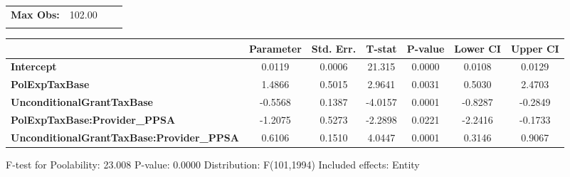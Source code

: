 \begin{center}
\begin{tabular}{lclc}
\textbf{Max Obs:}                                 &       102.00       & \textbf{                     }   &                  \\
\textbf{}                                         &                    & \textbf{                     }   &                  \\
\bottomrule
\end{tabular}
\begin{tabular}{lcccccc}
                                                  & \textbf{Parameter} & \textbf{Std. Err.} & \textbf{T-stat} & \textbf{P-value} & \textbf{Lower CI} & \textbf{Upper CI}  \\
\midrule
\textbf{Intercept}                                &       0.0119       &       0.0006       &      21.315     &      0.0000      &       0.0108      &       0.0129       \\
\textbf{PolExpTaxBase}                            &       1.4866       &       0.5015       &      2.9641     &      0.0031      &       0.5030      &       2.4703       \\
\textbf{UnconditionalGrantTaxBase}                &      -0.5568       &       0.1387       &     -4.0157     &      0.0001      &      -0.8287      &      -0.2849       \\
\textbf{PolExpTaxBase:Provider\_PPSA}             &      -1.2075       &       0.5273       &     -2.2898     &      0.0221      &      -2.2416      &      -0.1733       \\
\textbf{UnconditionalGrantTaxBase:Provider\_PPSA} &       0.6106       &       0.1510       &      4.0447     &      0.0001      &       0.3146      &       0.9067       \\
\bottomrule
\end{tabular}
\end{center}

F-test for Poolability: 23.008 \newline
 P-value: 0.0000 \newline
 Distribution: F(101,1994) \newline
  \newline
 Included effects: Entity